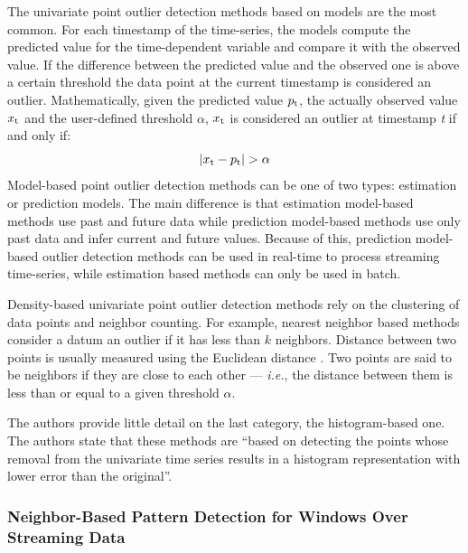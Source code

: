 The univariate point outlier detection methods based on models are the most common. For each timestamp of the time-series, the models compute the predicted value for the time-dependent variable and compare it with the observed value. If the difference between the predicted value and the observed one is above a certain threshold the data point at the current timestamp is considered an outlier. Mathematically, given the predicted value $p\textsubscript{t}$, the actually observed value $x\textsubscript{t}$ and the user-defined threshold $\alpha$, $x\textsubscript{t}$ is considered an outlier at timestamp \textit{t} if and only if:
\begin{equation*}
    |x\textsubscript{t}-p\textsubscript{t}|>\alpha
\end{equation*}
Model-based point outlier detection methods can be one of two types: estimation or prediction models. The main difference is that estimation model-based methods use past and future data while prediction model-based methods use only past data and infer current and future values. Because of this, prediction model-based outlier detection methods can be used in real-time to process streaming time-series, while estimation based methods can only be used in batch.

Density-based univariate point outlier detection methods rely on the clustering of data points and neighbor counting. For example, nearest neighbor based methods consider a datum an outlier if it has less than $k$ neighbors. Distance between two points is usually measured using the Euclidean distance \cite{elementary-algebra}. Two points are said to be neighbors if they are close to each other --- \textit{i.e.}, the distance between them is less than or equal to a given threshold $\alpha$.

The authors provide little detail on the last category, the histogram-based one. The authors state that these methods are ``based on detecting the points whose removal from the univariate time series results in a histogram representation with lower error than the original''.

\subsubsection{Neighbor-Based Pattern Detection for Windows Over Streaming Data} \label{alg:extran}
 
